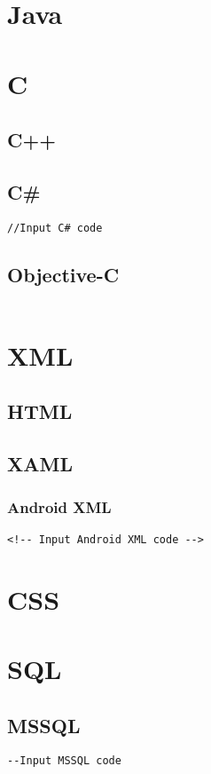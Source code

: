 


%







\newpage
\section{Java}
\newpage
\section{C}
\newpage
\subsection{C++}
\newpage
\subsection{C\#}
\begin{lstlisting}[style = CSharp]
//Input C# code
\end{lstlisting}
\newpage
\subsection{Objective-C}
\begin{lstlisting}

\end{lstlisting}
\newpage
\section{XML}
\newpage
\subsection{HTML}
\newpage
\subsection{XAML}
\newpage
\subsubsection{Android XML}
\begin{lstlisting}[style = AndroidXML]
<!-- Input Android XML code -->
\end{lstlisting}
\newpage
\section{CSS}
\newpage
\section{SQL}
\subsection{MSSQL}
\begin{lstlisting}[style = MSSQL]
--Input MSSQL code
\end{lstlisting}
